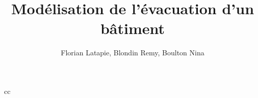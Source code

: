 \documentclass[]{report}
\title{Modélisation de l'évacuation d'un bâtiment}
\author{Florian Latapie, Blondin Remy, Boulton Nina}
\begin{document}
\maketitle
\tableofcontents 
\newpage

cc
\end{document}
